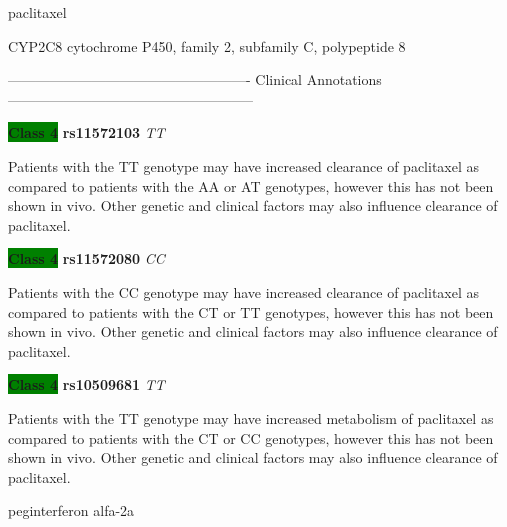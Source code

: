 \documentclass{resume} %
\begin{document}
\begin{rSection}{ paclitaxel }
\begin{rSubsection}{ CYP2C8 }{ cytochrome P450, family 2, subfamily C, polypeptide 8 }{}{}
\item[] ---------------------------------------------------- Clinical Annotations -----------------------------------------------------\newline
\item \textbf{\colorbox{green} {Class 4}} \textbf{ rs11572103 } \textit{ TT }
\item[] Patients with the TT genotype may have increased clearance of paclitaxel as compared to patients with the AA or AT genotypes, however this has not been shown in vivo. Other genetic and clinical factors may also influence clearance of paclitaxel.\item \textbf{\colorbox{green} {Class 4}} \textbf{ rs11572080 } \textit{ CC }
\item[] Patients with the CC genotype may have increased clearance of paclitaxel as compared to patients with the CT or TT genotypes, however this has not been shown in vivo. Other genetic and clinical factors may also influence clearance of paclitaxel.\item \textbf{\colorbox{green} {Class 4}} \textbf{ rs10509681 } \textit{ TT }
\item[] Patients with the TT genotype may have increased metabolism of paclitaxel as compared to patients with the CT or CC genotypes, however this has not been shown in vivo. Other genetic and clinical factors may also influence clearance of paclitaxel.
\end{rSubsection}

\end{rSection}\begin{rSection}{ peginterferon alfa-2a }
\item[]


\end{rSection}
\end{document}
